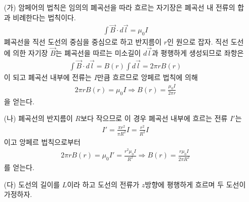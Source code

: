 \documentclass[tightenlines,floatfix,nofootinbib,superscriptaddress,fleqn]{revtex4}
\begin{document}
\begin{itemize}
  \item[(가)]
  암페어의 법칙은 임의의 폐곡선을 따라 흐르는 자기장은 폐곡선 내 전류의 합과 비례한다는 
  법칙이다.
  \begin{align}
    \int \vec{B}\cdot d\vec{l} = \mu_0 I
  \end{align}
  폐곡선을 직선 도선의 중심을 중심으로 하고 반지름이 $r$인 원으로 잡자. 직선 도선에 의한 
  자기장 $\vec{B}$는 폐곡선을 따르는 미소길이 $d\vec{l}$과 평행하게 생성되므로 좌항은
  \begin{align}
    \int \vec{B}\cdot d\vec{l} =B(r)\int d\vec{l} = 2\pi r B(r)
  \end{align}
  이 되고 폐곡선 내부에 전류는 $I$만큼 흐르므로 앙페르 법칙에 의해
  \begin{align}
  2\pi r B(r) = \mu_0 I\Longrightarrow B(r) = \frac{\mu_0 I}{2\pi r}
  \end{align}
  을 얻는다.
  \item[(나)]
  폐곡선의 반지름이 $R$보다 작으므로 이 경우 폐곡선 내부에 흐르는 전류 $I'$는 
  \begin{align}
    I' = \frac{\pi r^2}{\pi R^2} I = \frac{r^2}{R^2} I
  \end{align}
  이고 앙페르 법칙으로부터
  \begin{align}
    2\pi r B(r) = \mu_0 I' = \frac{r^2\mu_0 I}{R^2}
    \Longrightarrow B(r) = \frac{r\mu_0 I}{2\pi R^2}
  \end{align}
  를 얻는다.
  \item[(다)]
  도선의 길이를 $L$이라 하고 도선의 전류가 $z$방향에 평행하게 흐르며 두 도선이  가정하자. 
  
  

\end{itemize}


\\

\end{document}
